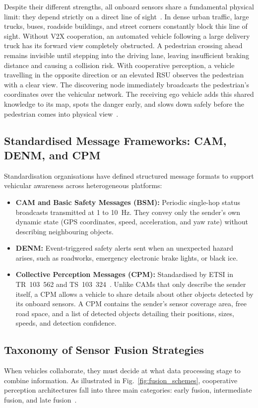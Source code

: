 Despite their different strengths, all onboard sensors share a fundamental physical limit: they depend strictly on a direct line of sight~\cite{zhang2026cooperative}.
In dense urban traffic, large trucks, buses, roadside buildings, and street corners constantly block this line of sight.
Without V2X cooperation, an automated vehicle following a large delivery truck has its forward view completely obstructed.
A pedestrian crossing ahead remains invisible until stepping into the driving lane, leaving insufficient braking distance and causing a collision risk.
With cooperative perception, a vehicle travelling in the opposite direction or an elevated RSU observes the pedestrian with a clear view.
The discovering node immediately broadcasts the pedestrian's coordinates over the vehicular network.
The receiving ego vehicle adds this shared knowledge to its map, spots the danger early, and slows down safely before the pedestrian comes into physical view~\cite{antonopoulos2026beyond}.

\subsection{Standardised Message Frameworks: CAM, DENM, and CPM}
Standardisation organisations have defined structured message formats to support vehicular awareness across heterogeneous platforms:
\begin{itemize}
    \item \textbf{CAM and Basic Safety Messages (BSM):} Periodic single-hop status broadcasts transmitted at 1 to 10~Hz.
    They convey only the sender's own dynamic state (GPS coordinates, speed, acceleration, and yaw rate) without describing neighbouring objects.
    \item \textbf{DENM:} Event-triggered safety alerts sent when an unexpected hazard arises, such as roadworks, emergency electronic brake lights, or black ice.
    \item \textbf{Collective Perception Messages (CPM):} Standardised by ETSI in TR~103~562 and TS~103~324~\cite{antonopoulos2026beyond}.
    Unlike CAMs that only describe the sender itself, a CPM allows a vehicle to share details about other objects detected by its onboard sensors.
    A CPM contains the sender's sensor coverage area, free road space, and a list of detected objects detailing their positions, sizes, speeds, and detection confidence.
\end{itemize}

\subsection{Taxonomy of Sensor Fusion Strategies}
When vehicles collaborate, they must decide at what data processing stage to combine information.
As illustrated in Fig.~\ref{fig:fusion_schemes}, cooperative perception architectures fall into three main categories: early fusion, intermediate fusion, and late fusion~\cite{huang2025v2x}.

